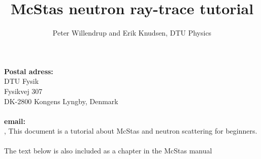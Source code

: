 \documentclass[a4paper]{article}
\title{McStas neutron ray-trace tutorial}
\author{Peter Willendrup and Erik Knudsen, DTU Physics}
\begin{document}
\maketitle
{\noindent \small {\bf Postal adress:}\\
DTU Fysik\\Fysikvej 307\\DK-2800
  Kongens Lyngby, Denmark\\\ \\{\bf
    email:}\\,}
\abstract \noindent This document is a tutorial about McStas and
neutron scattering for beginners.\\\ 
\\The text below is also included as a chapter in the McStas manual

\end{document}
